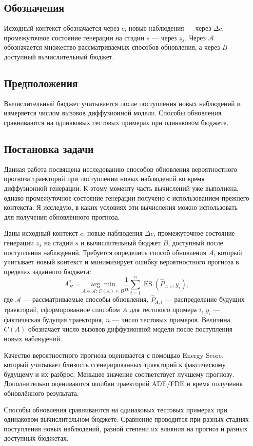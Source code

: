 \subsection{Обозначения}
Исходный контекст обозначается через $c$, новые наблюдения --- через $\Delta c$, промежуточное состояние генерации на стадии $s$ --- через $z_s$. Через $\mathcal A$ обозначается множество рассматриваемых способов обновления, а через $B$ --- доступный вычислительный бюджет.

\subsection{Предположения}
Вычислительный бюджет учитывается после поступления новых наблюдений и измеряется числом вызовов диффузионной модели. Способы обновления сравниваются на одинаковых тестовых примерах при одинаковом бюджете.

\subsection{Постановка задачи}\label{sec:problem}
Данная работа посвящена исследованию способов обновления вероятностного прогноза траекторий при поступлении новых наблюдений во время диффузионной генерации. К этому моменту часть вычислений уже выполнена, однако промежуточное состояние генерации получено с использованием прежнего контекста. Я исследую, в каких условиях эти вычисления можно использовать для получения обновлённого прогноза.

Даны исходный контекст $c$, новые наблюдения $\Delta c$, промежуточное состояние генерации $z_s$ на стадии $s$ и вычислительный бюджет $B$, доступный после поступления наблюдений. Требуется определить способ обновления $A$, который учитывает новый контекст и минимизирует ошибку вероятностного прогноза в пределах заданного бюджета:
\begin{equation}
A_B^{*}
=
\underset{A\in\mathcal A:\,C(A)\le B}{\arg\min}
\frac{1}{n}\sum_{i=1}^{n}
\operatorname{ES}\!\left(\widehat P_{A,i},y_i\right),
\end{equation}
где $\mathcal A$ --- рассматриваемые способы обновления, $\widehat P_{A,i}$ --- распределение будущих траекторий, сформированное способом $A$ для тестового примера $i$, $y_i$ --- фактическая будущая траектория, $n$ --- число тестовых примеров. Величина $C(A)$ обозначает число вызовов диффузионной модели после поступления новых наблюдений.

Качество вероятностного прогноза оценивается с помощью Energy Score, который учитывает близость сгенерированных траекторий к фактическому будущему и их разброс. Меньшее значение соответствует лучшему прогнозу. Дополнительно оцениваются ошибки траекторий ADE/FDE и время получения обновлённого результата.

Способы обновления сравниваются на одинаковых тестовых примерах при одинаковом вычислительном бюджете. Сравнение проводится при разных стадиях поступления новых наблюдений, разной степени их влияния на прогноз и разных доступных бюджетах.

\clearpage




